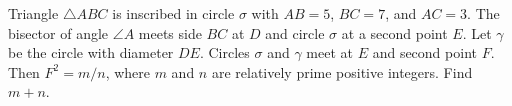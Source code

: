 Triangle $\triangle ABC$ is inscribed in circle $\sigma$ with $AB=5$, $BC=7$, and $AC=3$. The bisector of angle $\angle A$ meets side $BC$ at $D$ and circle $\sigma$ at a second point $E$. Let $\gamma$ be the circle with diameter $DE$. Circles $\sigma$ and $\gamma$ meet at $E$ and second point $F$. Then $F^{2}=m/n$, where $m$ and $n$ are relatively prime positive integers. Find $m+n$. 